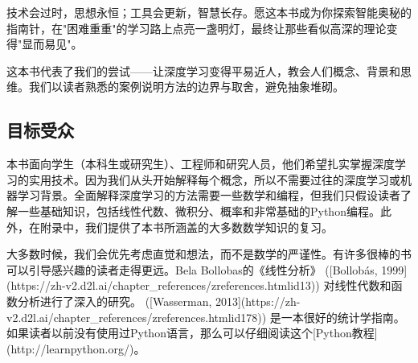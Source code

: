 技术会过时，思想永恒；工具会更新，智慧长存。愿这本书成为你探索智能奥秘的指南针，在"困难重重"的学习路上点亮一盏明灯，最终让那些看似高深的理论变得"显而易见"。

这本书代表了我们的尝试——让深度学习变得平易近人，教会人们概念、背景和思维。我们以读者熟悉的案例说明方法的边界与取舍，避免抽象堆砌。

\subsection{目标受众}

本书面向学生（本科生或研究生）、工程师和研究人员，他们希望扎实掌握深度学习的实用技术。因为我们从头开始解释每个概念，所以不需要过往的深度学习或机器学习背景。全面解释深度学习的方法需要一些数学和编程，但我们只假设读者了解一些基础知识，包括线性代数、微积分、概率和非常基础的Python编程。此外，在附录中，我们提供了本书所涵盖的大多数数学知识的复习。

大多数时候，我们会优先考虑直觉和想法，而不是数学的严谨性。有许多很棒的书可以引导感兴趣的读者走得更远。Bela Bollobas的《线性分析》 ([Bollobás, 1999](https://zh-v2.d2l.ai/chapter\_references/zreferences.htmlid13)) 对线性代数和函数分析进行了深入的研究。 ([Wasserman, 2013](https://zh-v2.d2l.ai/chapter\_references/zreferences.htmlid178)) 是一本很好的统计学指南。如果读者以前没有使用过Python语言，那么可以仔细阅读这个[Python教程](http://learnpython.org/)。

\newpage
